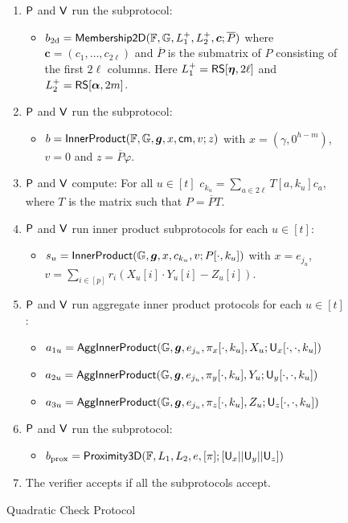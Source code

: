\begin{figure}[h!]
\begin{framed}
\begin{itemize}
\begin{enumerate}[{\rm 1.}]
\item $\mathsf{P}$ and $\mathsf{V}$ run the subprotocol:
	\begin{itemize}
	\item $b_{\rm
2d}=\mathsf{Membership2D}(\mathbb{F},\mathbb{G},L^{+}_1,L^{+}_2,\bm{c};\overline{P})$ where
$\bm{c}=(c_1,\ldots,c_{2\ell})$ and $\overline{P}$ is the submatrix of $P$ consisting
of the first $2\ell$ columns. Here $L^{+}_1=\mathsf{RS}[\bm{\eta},2\ell]$ and
$L^{+}_2=\mathsf{RS}[\bm{\alpha},2m]$.
	\end{itemize}
\item $\mathsf{P}$ and $\mathsf{V}$ run the subprotocol:
	\begin{itemize}
	\item $b=\mathsf{InnerProduct}(\mathbb{F},\mathbb{G},\bm{g},x,\mathsf{cm},v;z)$
with $x=(\gamma,0^{h-m})$, $v=0$ and $z=\overline{P}\varphi$.
	\end{itemize}
\item $\mathsf{P}$ and $\mathsf{V}$ compute: For all $u\in [t]$ $c_{k_u} =
\sum_{a\in 2\ell}T[a,k_u]c_a$, where $T$ is the matrix such that $P=\overline{P}T$.
\item $\mathsf{P}$ and $\mathsf{V}$ run inner product subprotocols for each $u\in
[t]$:
	\begin{itemize}
	\item $s_u=\mathsf{InnerProduct}(\mathbb{G},\bm{g},x,c_{k_u},v;P[\cdot,k_u])$ with
$x=e_{j_u}$, $v=\sum_{i\in [p]}r_i(X_u[i]\cdot Y_u[i] - Z_u[i])$.
	\end{itemize}
\item $\mathsf{P}$ and $\mathsf{V}$ run aggregate inner product protocols for each
$u\in [t]$:
	\begin{itemize}
	\item
$a_{1u}=\mathsf{AggInnerProduct}(\mathbb{G},\bm{g},e_{j_u},\pi_x[\cdot,k_u],X_u;\mathsf{U}_x[\cdot,\cdot,k_u])$
	\item
$a_{2u}=\mathsf{AggInnerProduct}(\mathbb{G},\bm{g},e_{j_u},\pi_y[\cdot,k_u],Y_u;\mathsf{U}_y[\cdot,\cdot,k_u])$
	\item
$a_{3u}=\mathsf{AggInnerProduct}(\mathbb{G},\bm{g},e_{j_u},\pi_z[\cdot,k_u],Z_u;\mathsf{U}_z[\cdot,\cdot,k_u])$
	\end{itemize}
\item $\mathsf{P}$ and $\mathsf{V}$ run the subprotocol: 
	\begin{itemize}
	\item $b_{\rm prox} =
\mathsf{Proximity3D}(\mathbb{F},L_1,L_2,e,[\pi];[\mathsf{U}_x||\mathsf{U}_y||\mathsf{U}_z])$
	\end{itemize}
\item The verifier accepts if all the subprotocols accept.
\end{enumerate}
\end{itemize}
\end{framed}
\caption{Quadratic Check Protocol}
\label{fig:quadcheck}
\end{figure}

